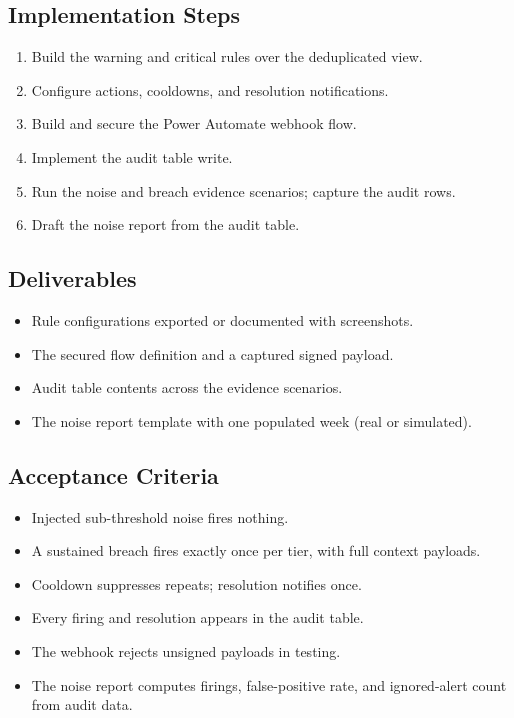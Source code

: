 \subsection*{Implementation Steps}
\begin{enumerate}
    \item Build the warning and critical rules over the deduplicated view.
    \item Configure actions, cooldowns, and resolution notifications.
    \item Build and secure the Power Automate webhook flow.
    \item Implement the audit table write.
    \item Run the noise and breach evidence scenarios; capture the audit rows.
    \item Draft the noise report from the audit table.
\end{enumerate}

\subsection*{Deliverables}
\begin{itemize}
    \item Rule configurations exported or documented with screenshots.
    \item The secured flow definition and a captured signed payload.
    \item Audit table contents across the evidence scenarios.
    \item The noise report template with one populated week (real or simulated).
\end{itemize}

\subsection*{Acceptance Criteria}
\begin{itemize}
    \item[\(\square\)] Injected sub-threshold noise fires nothing.
    \item[\(\square\)] A sustained breach fires exactly once per tier, with full context payloads.
    \item[\(\square\)] Cooldown suppresses repeats; resolution notifies once.
    \item[\(\square\)] Every firing and resolution appears in the audit table.
    \item[\(\square\)] The webhook rejects unsigned payloads in testing.
    \item[\(\square\)] The noise report computes firings, false-positive rate, and ignored-alert count from audit data.
\end{itemize}

